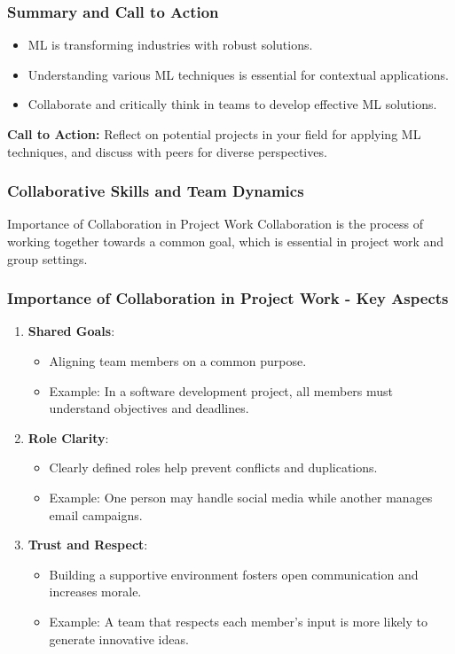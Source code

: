 \documentclass[aspectratio=169]{beamer}
\begin{document}
\begin{frame}[fragile]
    \frametitle{Summary and Call to Action}
    \begin{itemize}
        \item ML is transforming industries with robust solutions.
        \item Understanding various ML techniques is essential for contextual applications.
        \item Collaborate and critically think in teams to develop effective ML solutions.
    \end{itemize}
    \textbf{Call to Action:} Reflect on potential projects in your field for applying ML techniques, and discuss with peers for diverse perspectives.
\end{frame}

\begin{frame}[fragile]
    \frametitle{Collaborative Skills and Team Dynamics}
    \begin{block}{Importance of Collaboration in Project Work}
        Collaboration is the process of working together towards a common goal, which is essential in project work and group settings.
    \end{block}
\end{frame}

\begin{frame}[fragile]
    \frametitle{Importance of Collaboration in Project Work - Key Aspects}
    \begin{enumerate}
        \item \textbf{Shared Goals}:
            \begin{itemize}
                \item Aligning team members on a common purpose.
                \item Example: In a software development project, all members must understand objectives and deadlines.
            \end{itemize}
        \item \textbf{Role Clarity}:
            \begin{itemize}
                \item Clearly defined roles help prevent conflicts and duplications.
                \item Example: One person may handle social media while another manages email campaigns.
            \end{itemize}
        \item \textbf{Trust and Respect}:
            \begin{itemize}
                \item Building a supportive environment fosters open communication and increases morale.
                \item Example: A team that respects each member's input is more likely to generate innovative ideas.
            \end{itemize}
    \end{enumerate}
\end{frame}
\end{document}
